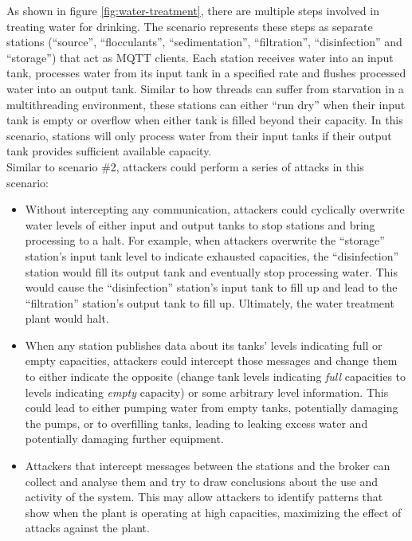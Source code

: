 As shown in figure \ref{fig:water-treatment}, there are multiple steps involved in treating water for drinking. The scenario represents these steps as separate stations (\enquote{source}, \enquote{flocculants}, \enquote{sedimentation}, \enquote{filtration}, \enquote{disinfection} and \enquote{storage}) that act as \ac{MQTT} clients. Each station receives water into an input tank, processes water from its input tank in a specified rate and flushes processed water into an output tank. Similar to how threads can suffer from starvation in a multithreading environment, these stations can either \enquote{run dry} when their input tank is empty or overflow when either tank is filled beyond their capacity. In this scenario, stations will only process water from their input tanks if their output tank provides sufficient available capacity.\\
Similar to scenario \#2, attackers could perform a series of attacks in this scenario:
\begin{itemize}
    \item Without intercepting any communication, attackers could cyclically overwrite water levels of either input and output tanks to stop stations and bring processing to a halt. For example, when attackers overwrite the \enquote{storage} station's input tank level to indicate exhausted capacities, the \enquote{disinfection} station would fill its output tank and eventually stop processing water. This would cause the \enquote{disinfection} station's input tank to fill up and lead to the \enquote{filtration} station's output tank to fill up. Ultimately, the water treatment plant would halt.
    \item When any station publishes data about its tanks' levels indicating full or empty capacities, attackers could intercept those messages and change them to either indicate the opposite (change tank levels indicating \emph{full} capacities to levels indicating \emph{empty} capacity) or some arbitrary level information. This could lead to either pumping water from empty tanks, potentially damaging the pumps, or to overfilling tanks, leading to leaking excess water and potentially damaging further equipment.
    \item Attackers that intercept messages between the stations and the broker can collect and analyse them and try to draw conclusions about the use and activity of the system. This may allow attackers to identify patterns that show when the plant is operating at high capacities, maximizing the effect of attacks against the plant.
\end{itemize}
